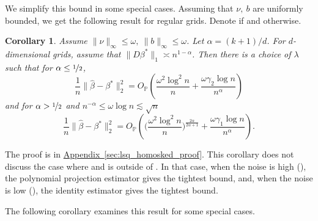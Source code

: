\documentclass[ejs,noshowframe]{imsart}
\theoremstyle{plain}
\newtheorem{corollary}[theorem]{Corollary}
\theoremstyle{definition}
\newcommand{\aref}[1]{\hyperref[#1]{Appendix~\ref*{#1}}}
\renewcommand{\P}{\mathbb{P}}
\newcommand{\cN}{\mathcal{N}}
\renewcommand{\hat}{\widehat}
\newcommand{\half}{\nicefrac{1}{2}}
\begin{document}
We simplify this bound in some special cases.
Assuming that $\nu,\ b$ are uniformly bounded, 
we get the following result for regular grids.
Denote  if  and 
 otherwise.
\begin{corollary}
\label{cor:lsq_homosked}
Assume $\|\nu\|_\infty \leq \omega,\ \| b \|_\infty \leq \omega$. 
Let $\alpha = (k+1)/d$. 
For $d$-dimensional grids, assume that $\|D\beta^* \|_1 \asymp n^{1-\alpha}$.
Then there is a choice of $\lambda$ such that for $\alpha \le \half$,
\begin{equation}
\frac{1}{n}\| \hat \beta - \beta^* \|_2^2 = 
O_\P \left( \frac{\omega^2 \log^2 n}{n} + \frac{\omega\gamma_2 \log n}{n^\alpha} 
\right)
\end{equation}
and for $\alpha > \half$ and $ n^{-\alpha}  \leq \omega \log n   \lesssim \sqrt 
n$
\begin{equation}
\frac{1}{n}\| \hat \beta - \beta^* \|_2^2 = 
O_\P   \left( \Big(\frac{\omega^2  \log^2 n}{n} \Big) 
^{\frac{2\alpha}{2\alpha +1}} + \frac{\omega\gamma_1 \log n}{n^\alpha} \right).
\end{equation}
\end{corollary}

The proof is in \aref{sec:lsq_homosked_proof}. This corollary does not
discuss the case where \smash{$\alpha > \half$} and  is  
outside of . In that case, when the noise is 
high 
(),
the polynomial projection estimator  
\smash{$\hat\beta = P_\cN y$}
gives the tightest bound, and, when the noise is low
(),
the identity estimator gives the tightest bound.


The following corollary examines this result for some special cases.

\end{document}
